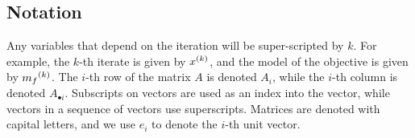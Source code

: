   
% 
% 
% 
% 
% 
% 
% 

\subsection{Notation}

Any variables that depend on the iteration will be super-scripted by $k$.
For example, the $k$-th iterate is given by ${x}^{(k)}$, and the model of the objective is given by ${{m}_f}^{(k)}$.
The $i$-th row of the matrix $A$ is denoted $A_i$, while the $i$-th column is denoted $A_{\bullet i}$.
Subscripts on vectors are used as an index into the vector, while vectors in a sequence of vectors use superscripts.
Matrices are denoted with capital letters, and we use $e_i$ to denote the $i$-th unit vector.                     %

